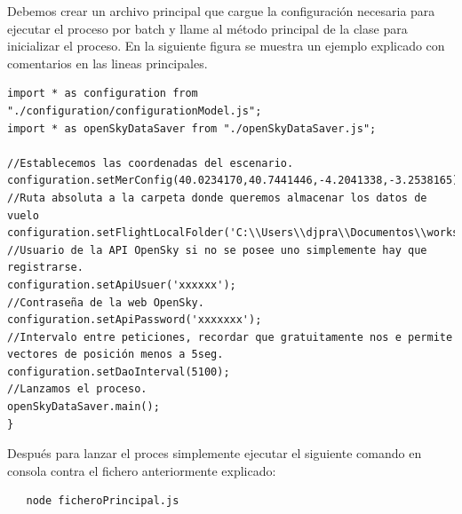 \documentclass[a4paper, 11pt]{book}
\begin{document}
Debemos crear un archivo principal que cargue la configuración necesaria para ejecutar el proceso por batch y llame al método principal de la clase para inicializar el proceso. En la siguiente figura se muestra un ejemplo explicado con comentarios en las lineas principales.
\begin{verbatim}
import * as configuration from "./configuration/configurationModel.js";
import * as openSkyDataSaver from "./openSkyDataSaver.js";

//Establecemos las coordenadas del escenario.
configuration.setMerConfig(40.0234170,40.7441446,-4.2041338,-3.2538165);
//Ruta absoluta a la carpeta donde queremos almacenar los datos de vuelo
configuration.setFlightLocalFolder('C:\\Users\\djpra\\Documentos\\workspaceTFG\\........');
//Usuario de la API OpenSky si no se posee uno simplemente hay que registrarse.
configuration.setApiUsuer('xxxxxx');
//Contraseña de la web OpenSky.
configuration.setApiPassword('xxxxxxx');
//Intervalo entre peticiones, recordar que gratuitamente nos e permite vectores de posición menos a 5seg.
configuration.setDaoInterval(5100);
//Lanzamos el proceso.
openSkyDataSaver.main();
}
\end{verbatim}

Después para lanzar el proces simplemente ejecutar el siguiente comando en consola contra el fichero anteriormente explicado:
{\scriptsize
    \begin{verbatim}
   node ficheroPrincipal.js
    \end{verbatim}
}
\end{document}

